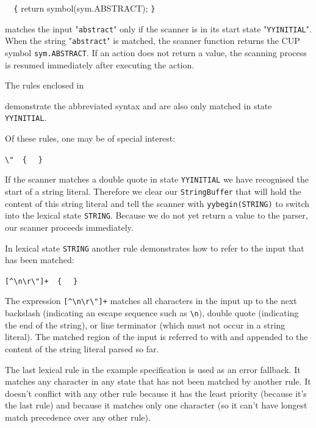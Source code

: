 \documentclass[11pt]{scrartcl}
\newcommand{\bl}{\latex{\symbol{123}}\html{\{}}
\newcommand{\br}{\latex{\symbol{125}}\html{\}}}
\begin{document}
{\ttfamily{}\verb+  {+ return symbol(sym.ABSTRACT); \verb+}+}

matches the input "\texttt{abstract}" only if the scanner is in its
start state "\texttt{YYINITIAL}". When the string "\texttt{abstract}" is
matched, the scanner function returns the CUP symbol \texttt{sym.ABSTRACT}.
If an action does not return a value, the scanning process is resumed immediately 
after executing the action.
\label{ExampleRulesBunch}

The rules enclosed in

\texttt{\htmlref{<YYINITIAL> \bl \\
\ \ ...\\
\br}{CodeRulesBunch}}

demonstrate the abbreviated syntax and are also only matched in state \texttt{YYINITIAL}.
\label{ExampleRulesYYbegin}

Of these rules, one may be of special interest:

\verb+\"  { + \texttt{}\verb+ }+

If the scanner matches a double quote in state \texttt{YYINITIAL} we
have recognised the start of a string literal. Therefore we clear our \texttt{StringBuffer}
that will hold the content of this string literal and tell the scanner
with \texttt{yybegin(STRING)} to switch into the lexical state \texttt{STRING}.
Because we do not yet return a value to the parser, our scanner proceeds
immediately.
\label{ExampleRulesYYtext}

In lexical state \texttt{STRING} another
rule demonstrates how to refer to the input that has been matched:

\verb-[^\n\r\"]+  { - \texttt{}\verb+ }+

The expression \verb-[^\n\r\"]+- matches
all characters in the input up to the next backslash (indicating an
escape sequence such as \verb+\n+), double quote (indicating the end
of the string), or line terminator (which must not occur in a string literal).
The matched region of the input is referred to with \texttt{}
and appended to the content of the string literal parsed so far.
\label{ExampleRuleLast}

The last lexical rule in the example specification
is used as an error fallback. It matches any character in any state that
has not been matched by another rule. It doesn't conflict with any other
rule because it has the least priority (because it's the last rule) and
because it matches only one character (so it can't have longest match
precedence over any other rule).
 
\end{document}
